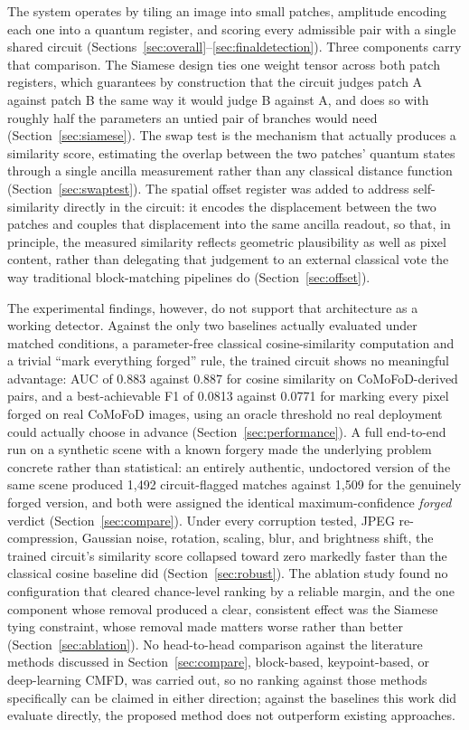 \documentclass[conference]{IEEEtran}
\begin{document}
The system operates by tiling an image into small patches, amplitude encoding each one into a quantum register, and scoring every admissible pair with a single shared circuit (Sections~\ref{sec:overall}--\ref{sec:finaldetection}). Three components carry that comparison. The Siamese design ties one weight tensor across both patch registers, which guarantees by construction that the circuit judges patch A against patch B the same way it would judge B against A, and does so with roughly half the parameters an untied pair of branches would need (Section~\ref{sec:siamese}). The swap test is the mechanism that actually produces a similarity score, estimating the overlap between the two patches' quantum states through a single ancilla measurement rather than any classical distance function (Section~\ref{sec:swaptest}). The spatial offset register was added to address self-similarity directly in the circuit: it encodes the displacement between the two patches and couples that displacement into the same ancilla readout, so that, in principle, the measured similarity reflects geometric plausibility as well as pixel content, rather than delegating that judgement to an external classical vote the way traditional block-matching pipelines do (Section~\ref{sec:offset}).

The experimental findings, however, do not support that architecture as a working detector. Against the only two baselines actually evaluated under matched conditions, a parameter-free classical cosine-similarity computation and a trivial ``mark everything forged'' rule, the trained circuit shows no meaningful advantage: AUC of 0.883 against 0.887 for cosine similarity on CoMoFoD-derived pairs, and a best-achievable F1 of 0.0813 against 0.0771 for marking every pixel forged on real CoMoFoD images, using an oracle threshold no real deployment could actually choose in advance (Section~\ref{sec:performance}). A full end-to-end run on a synthetic scene with a known forgery made the underlying problem concrete rather than statistical: an entirely authentic, undoctored version of the same scene produced 1,492 circuit-flagged matches against 1,509 for the genuinely forged version, and both were assigned the identical maximum-confidence \emph{forged} verdict (Section~\ref{sec:compare}). Under every corruption tested, JPEG re-compression, Gaussian noise, rotation, scaling, blur, and brightness shift, the trained circuit's similarity score collapsed toward zero markedly faster than the classical cosine baseline did (Section~\ref{sec:robust}). The ablation study found no configuration that cleared chance-level ranking by a reliable margin, and the one component whose removal produced a clear, consistent effect was the Siamese tying constraint, whose removal made matters worse rather than better (Section~\ref{sec:ablation}). No head-to-head comparison against the literature methods discussed in Section~\ref{sec:compare}, block-based, keypoint-based, or deep-learning CMFD, was carried out, so no ranking against those methods specifically can be claimed in either direction; against the baselines this work did evaluate directly, the proposed method does not outperform existing approaches.
\end{document}
